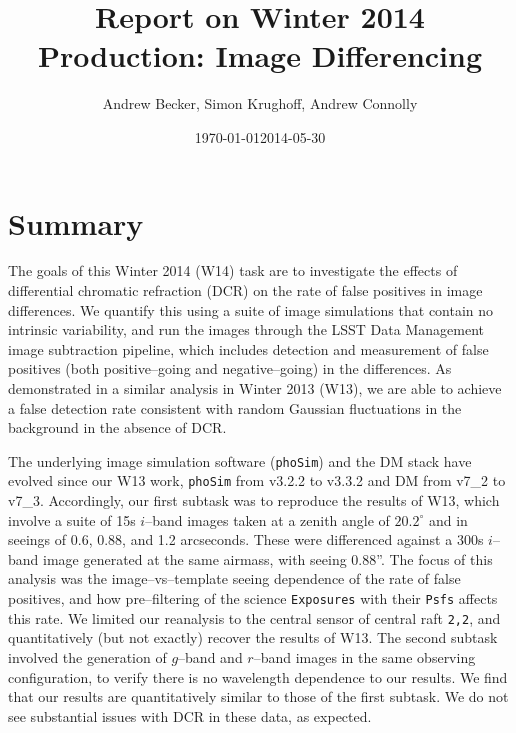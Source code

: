 \documentclass[DM,toc]{lsstdoc}
\title{Report on Winter 2014 Production: Image Differencing}
\date{\today}
\author{
Andrew Becker, Simon Krughoff, Andrew Connolly
}
\date{2014-05-30}
\begin{document}
\maketitle

\section{Summary}

The goals of this Winter 2014 (W14) task are to investigate the
effects of differential chromatic refraction (DCR) on the rate of
false positives in image differences.  We quantify this using a suite
of image simulations that contain no intrinsic variability, and run
the images through the LSST Data Management image subtraction
pipeline, which includes detection and measurement of false positives
(both positive--going and negative--going) in the differences.  As
demonstrated in a similar analysis in Winter 2013 (W13), we are able
to achieve a false detection rate consistent with random Gaussian
fluctuations in the background in the absence of DCR.

The underlying image simulation software ({\tt phoSim}) and the DM
stack have evolved since our W13 work, {\tt phoSim} from v3.2.2 to
v3.3.2 and DM from v7\_2 to v7\_3.  Accordingly, our first subtask was
to reproduce the results of W13, which involve a suite of 15s
$i$--band images taken at a zenith angle of $20.2^{\circ}$ and in
seeings of 0.6, 0.88, and 1.2 arcseconds.  These were differenced
against a 300s $i$--band image generated at the same airmass, with
seeing 0.88''.  The focus of this analysis was the image--vs--template
seeing dependence of the rate of false positives, and how
pre--filtering of the science {\tt Exposures} with their {\tt Psfs}
affects this rate.  We limited our reanalysis to the central sensor of
central raft {\tt 2,2}, and quantitatively (but not exactly) recover
the results of W13.  The second subtask involved the generation of
$g$--band and $r$--band images in the same observing configuration, to
verify there is no wavelength dependence to our results.  We find that
our results are quantitatively similar to those of the first subtask.
We do not see substantial issues with DCR in these data, as expected.
\end{document}
